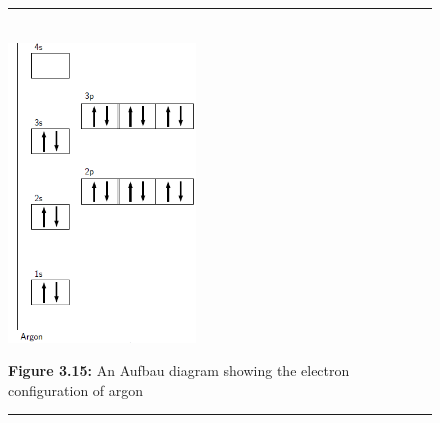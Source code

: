 	\begin{figure}[H] %
    \begin{center}
    \rule[.1in]{\figurerulewidth}{.005in} \\
        \label{m38741*uid103!!!underscore!!!media}\label{m38741*uid103!!!underscore!!!printimage}\includegraphics[height=300px]{col11305.imgs/m38741_CG10C3_011.png} %
      \vspace{2pt}
    \vspace{\rubberspace}\par \begin{cnxcaption}
	  \small \textbf{Figure 3.15: }An Aufbau diagram showing the electron configuration of argon
	\end{cnxcaption}
    \vspace{.1in}
    \rule[.1in]{\figurerulewidth}{.005in} \\
    \end{center}
 \end{figure}       
      \par
            \label{m38741*eip-138}\vspace{.5cm} 
      \noindent
